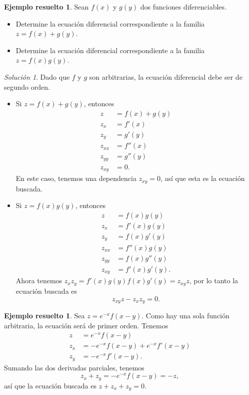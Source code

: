\documentclass[11pt,letterpaper,draft]{report}
\theoremstyle{plain}
\theoremstyle{definition}
\newtheorem{solved}[theorem]{Ejemplo resuelto}
\theoremstyle{remark}
\newtheorem*{solution}{Solución}
\newcommand\<{\langle}
\renewcommand\>{\rangle}
\begin{document}
\begin{solved}
  Sean $f(x)$ y $g(y)$ dos funciones diferenciables.
  \begin{itemize}
    \item
      Determine la ecuación diferencial correspondiente a la familia
      $z = f(x) + g(y)$.
    \item 
      Determine la ecuación diferencial correspondiente a la familia
      $z = f(x)g(y)$.
  \end{itemize}
  \begin{solution}
    Dado que $f$ y $g$ son arbitrarias, la ecuación
    diferencial debe ser de segundo orden.
    \begin{itemize}
      \item
        Si $z = f(x) + g(y)$, entonces
         \begin{align*}
           z &= f(x)+g(y)\\
           z_x &= f'(x)\\
           z_y &= g'(y)\\
           z_{xx} &= f''(x)\\
           z_{yy} &= g''(y)\\
           z_{xy} &= 0.
        \end{align*}
        En este caso, tenemos una dependencia \(z_{xy}=0\),
        así que esta es la ecuación buscada.
      \item 
        Si $z = f(x)g(y)$, entonces
        \begin{align*}
          z &= f(x)g(y)\\
          z_x &= f'(x)g(y)\\
          z_y &= f(x)g'(y)\\
          z_{xx} &= f''(x)g(y)\\
          z_{yy} &= f(x)g''(y)\\
          z_{xy} &= f'(x)g'(y).
        \end{align*}
        Ahora tenemos $z_x z_y = f'(x)g(y)f(x)g'(y) = z_{xy} z$, por lo
        tanto la ecuación buscada es
        \[
          z_{xy} z - z_x z_y = 0.
        \] 
    \end{itemize}
  \end{solution}
\end{solved}

\begin{solved}
  Sea $z = e^{-x} f(x-y)$. Como hay una sola función arbitraria, la
  ecuación será de primer orden. Tenemos
  \begin{align*}
    z &= e^{-x} f(x-y) \\
    z_x &= -e^{-x} f(x-y) + e^{-x} f'(x-y)\\
    z_y &= -e^{-x} f'(x-y).
  \end{align*}
  Sumando las dos derivadas parciales, tenemos
  \[
    z_x + z_y = -e^{-x} f(x-y) = -z,
  \] 
  así que la ecuación buscada es \(z + z_x + z_y = 0\).
\end{solved}
\end{document}
